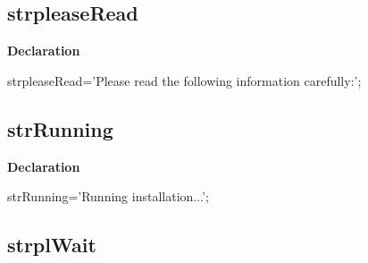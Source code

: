 \documentclass{report}
\newif\ifpdf
\begin{document}
\subsection*{strpleaseRead}
\fi
\label{trstrings-strpleaseRead}
\begin{list}{}{
\setlength{\itemindent}{0cm}
\setlength{\listparindent}{0cm}
\setlength{\leftmargin}{\evensidemargin}
\addtolength{\leftmargin}{\tmplength}
\settowidth{\labelsep}{X}
\addtolength{\leftmargin}{\labelsep}
\setlength{\labelwidth}{\tmplength}
}
\item[\textbf{Declaration}\hfill]
\ifpdf
\begin{flushleft}
\fi
\begin{ttfamily}
strpleaseRead='Please read the following information carefully:';\end{ttfamily}

\ifpdf
\end{flushleft}
\fi

\end{list}
\ifpdf
\subsection*{\large{\textbf{strRunning}}\normalsize\hspace{1ex}\hrulefill}
\else
\subsection*{strRunning}
\fi
\label{trstrings-strRunning}
\begin{list}{}{
\setlength{\itemindent}{0cm}
\setlength{\listparindent}{0cm}
\setlength{\leftmargin}{\evensidemargin}
\addtolength{\leftmargin}{\tmplength}
\settowidth{\labelsep}{X}
\addtolength{\leftmargin}{\labelsep}
\setlength{\labelwidth}{\tmplength}
}
\item[\textbf{Declaration}\hfill]
\ifpdf
\begin{flushleft}
\fi
\begin{ttfamily}
strRunning='Running installation...';\end{ttfamily}

\ifpdf
\end{flushleft}
\fi

\end{list}
\ifpdf
\subsection*{\large{\textbf{strplWait}}\normalsize\hspace{1ex}\hrulefill}
\else
\end{document}
